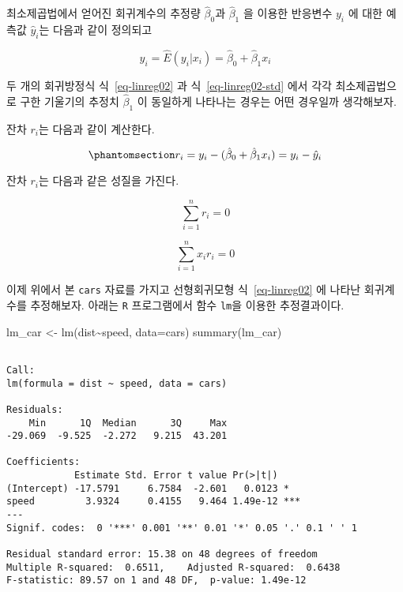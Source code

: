 \documentclass[
  11pt,
  a4paper,
  oneside]{scrbook}
\newenvironment{Shaded}{\begin{snugshade}}{\end{snugshade}}
\newcommand{\AttributeTok}[1]{\textcolor[rgb]{0.40,0.45,0.13}{#1}}
\newcommand{\FunctionTok}[1]{\textcolor[rgb]{0.28,0.35,0.67}{#1}}
\newcommand{\NormalTok}[1]{\textcolor[rgb]{0.00,0.23,0.31}{#1}}
\newcommand{\OtherTok}[1]{\textcolor[rgb]{0.00,0.23,0.31}{#1}}
\newcommand{\SpecialCharTok}[1]{\textcolor[rgb]{0.37,0.37,0.37}{#1}}
\theoremstyle{definition}
\theoremstyle{plain}
\theoremstyle{definition}
\theoremstyle{definition}
\theoremstyle{remark}
\begin{document}
최소제곱법에서 얻어진 회귀계수의 추정량 \(\hat \beta_0\)과
\(\hat \beta_1\) 을 이용한 반응변수 \(y_i\) 에 대한 예측값
\(\hat y_i\)는 다음과 같이 정의되고

\[ \hat y_i = \hat E(y_i|x_i) = \hat \beta_0 + \hat \beta_1 x_i \]

\begin{tcolorbox}[enhanced jigsaw, colback=white, title=\textcolor{quarto-callout-caution-color}{\faFire}\hspace{0.5em}{표준화 전과 후}, colbacktitle=quarto-callout-caution-color!10!white, toprule=.15mm, breakable, bottomtitle=1mm, left=2mm, colframe=quarto-callout-caution-color-frame, leftrule=.75mm, coltitle=black, toptitle=1mm, titlerule=0mm, arc=.35mm, opacityback=0, opacitybacktitle=0.6, rightrule=.15mm, bottomrule=.15mm]

두 개의 회귀방정식 식~\ref{eq-linreg02} 과 식~\ref{eq-linreg02-std} 에서
각각 최소제곱법으로 구한 기울기의 추정치 \(\hat \beta_1\) 이 동일하게
나타나는 경우는 어떤 경우일까 생각해보자.

\end{tcolorbox}

잔차 \(r_i\)는 다음과 같이 계산한다.

\begin{equation}\phantomsection\label{eq-residual}{
r_i = y_i - (\hat \beta_0 + \hat \beta_1 x_i) = y_i -\hat y_i  
}\end{equation}

잔차 \(r_i\)는 다음과 같은 성질을 가진다.

\[ \sum_{i=1}^n r_i = 0 \]

\[ \sum_{i=1}^n x_i r_i = 0 \]

이제 위에서 본 \texttt{cars} 자료를 가지고 선형회귀모형
식~\ref{eq-linreg02} 에 나타난 회귀계수를 추정해보자. 아래는 \texttt{R}
프로그램에서 함수 \texttt{lm}을 이용한 추정결과이다.

\begin{Shaded}
\begin{Highlighting}[]
\NormalTok{lm\_car }\OtherTok{\textless{}{-}} \FunctionTok{lm}\NormalTok{(dist}\SpecialCharTok{\textasciitilde{}}\NormalTok{speed, }\AttributeTok{data=}\NormalTok{cars)}
\FunctionTok{summary}\NormalTok{(lm\_car)}
\end{Highlighting}
\end{Shaded}

\begin{verbatim}

Call:
lm(formula = dist ~ speed, data = cars)

Residuals:
    Min      1Q  Median      3Q     Max 
-29.069  -9.525  -2.272   9.215  43.201 

Coefficients:
            Estimate Std. Error t value Pr(>|t|)    
(Intercept) -17.5791     6.7584  -2.601   0.0123 *  
speed         3.9324     0.4155   9.464 1.49e-12 ***
---
Signif. codes:  0 '***' 0.001 '**' 0.01 '*' 0.05 '.' 0.1 ' ' 1

Residual standard error: 15.38 on 48 degrees of freedom
Multiple R-squared:  0.6511,    Adjusted R-squared:  0.6438 
F-statistic: 89.57 on 1 and 48 DF,  p-value: 1.49e-12
\end{verbatim}
\end{document}
